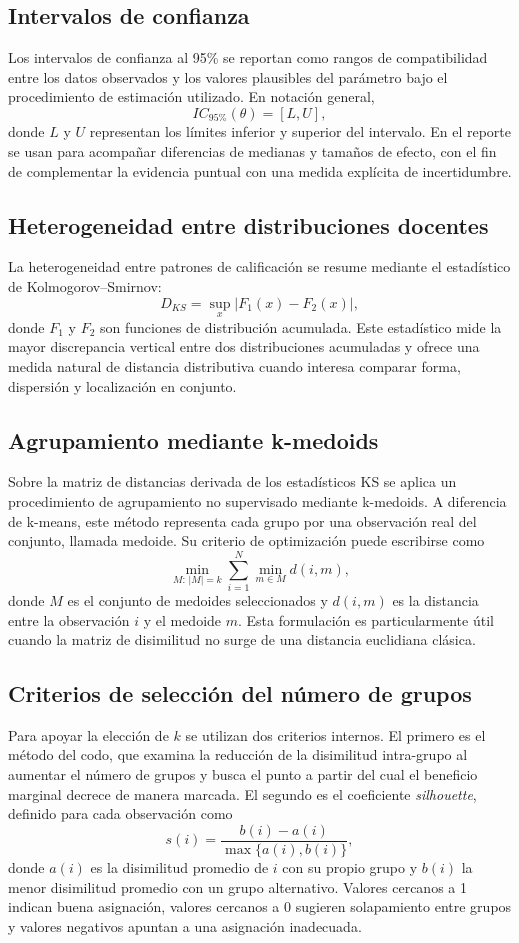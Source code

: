 \documentclass[8pt,a4paper]{article} %
\numberwithin{figure}{subsection}
\begin{document}
\subsection{Intervalos de confianza}
Los intervalos de confianza al 95\% se reportan como rangos de compatibilidad entre los datos observados y los valores plausibles del parámetro bajo el procedimiento de estimación utilizado. En notación general,
\[
IC_{95\%}(\theta)=[L,U],
\]
donde $L$ y $U$ representan los límites inferior y superior del intervalo. En el reporte se usan para acompañar diferencias de medianas y tamaños de efecto, con el fin de complementar la evidencia puntual con una medida explícita de incertidumbre.

\subsection{Heterogeneidad entre distribuciones docentes}
La heterogeneidad entre patrones de calificación se resume mediante el estadístico de Kolmogorov--Smirnov:
\[
D_{KS}=\sup_x |F_1(x)-F_2(x)|,
\]
donde $F_1$ y $F_2$ son funciones de distribución acumulada. Este estadístico mide la mayor discrepancia vertical entre dos distribuciones acumuladas y ofrece una medida natural de distancia distributiva cuando interesa comparar forma, dispersión y localización en conjunto.

\subsection{Agrupamiento mediante k-medoids}
Sobre la matriz de distancias derivada de los estadísticos KS se aplica un procedimiento de agrupamiento no supervisado mediante k-medoids. A diferencia de k-means, este método representa cada grupo por una observación real del conjunto, llamada medoide. Su criterio de optimización puede escribirse como
\[
\min_{M:\,|M|=k}\sum_{i=1}^{N}\min_{m\in M} d(i,m),
\]
donde $M$ es el conjunto de medoides seleccionados y $d(i,m)$ es la distancia entre la observación $i$ y el medoide $m$. Esta formulación es particularmente útil cuando la matriz de disimilitud no surge de una distancia euclidiana clásica.

\subsection{Criterios de selección del número de grupos}
Para apoyar la elección de $k$ se utilizan dos criterios internos. El primero es el método del codo, que examina la reducción de la disimilitud intra-grupo al aumentar el número de grupos y busca el punto a partir del cual el beneficio marginal decrece de manera marcada. El segundo es el coeficiente \textit{silhouette}, definido para cada observación como
\[
s(i)=\frac{b(i)-a(i)}{\max\{a(i),b(i)\}},
\]
donde $a(i)$ es la disimilitud promedio de $i$ con su propio grupo y $b(i)$ la menor disimilitud promedio con un grupo alternativo. Valores cercanos a 1 indican buena asignación, valores cercanos a 0 sugieren solapamiento entre grupos y valores negativos apuntan a una asignación inadecuada.
\end{document}

